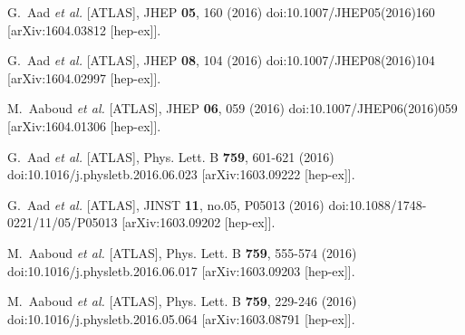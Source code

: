\begin{thebibliography}{9}
G.~Aad \textit{et al.} [ATLAS],
JHEP \textbf{05}, 160 (2016)
doi:10.1007/JHEP05(2016)160
[arXiv:1604.03812 [hep-ex]].

G.~Aad \textit{et al.} [ATLAS],
JHEP \textbf{08}, 104 (2016)
doi:10.1007/JHEP08(2016)104
[arXiv:1604.02997 [hep-ex]].

M.~Aaboud \textit{et al.} [ATLAS],
JHEP \textbf{06}, 059 (2016)
doi:10.1007/JHEP06(2016)059
[arXiv:1604.01306 [hep-ex]].

G.~Aad \textit{et al.} [ATLAS],
Phys. Lett. B \textbf{759}, 601-621 (2016)
doi:10.1016/j.physletb.2016.06.023
[arXiv:1603.09222 [hep-ex]].

G.~Aad \textit{et al.} [ATLAS],
JINST \textbf{11}, no.05, P05013 (2016)
doi:10.1088/1748-0221/11/05/P05013
[arXiv:1603.09202 [hep-ex]].

M.~Aaboud \textit{et al.} [ATLAS],
Phys. Lett. B \textbf{759}, 555-574 (2016)
doi:10.1016/j.physletb.2016.06.017
[arXiv:1603.09203 [hep-ex]].

M.~Aaboud \textit{et al.} [ATLAS],
Phys. Lett. B \textbf{759}, 229-246 (2016)
doi:10.1016/j.physletb.2016.05.064
[arXiv:1603.08791 [hep-ex]].


\end{thebibliography}
